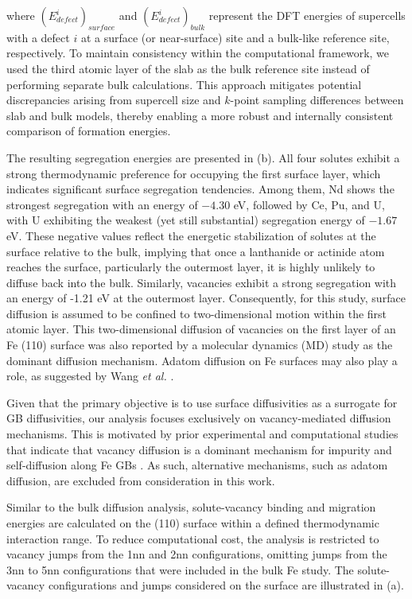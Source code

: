 \documentclass[preprint,12pt]{elsarticle}
\begin{document}
\noindent where \( (E_{defect}^{i})_{surface} \) and \( (E_{defect}^{i})_{bulk} \) represent the DFT energies of supercells with a defect $i$ at a surface (or near-surface) site and a bulk-like reference site, respectively. To maintain consistency within the computational framework, we used the third atomic layer of the slab as the bulk reference site instead of performing separate bulk calculations. This approach mitigates potential discrepancies arising from supercell size and \( k \)-point sampling differences between slab and bulk models, thereby enabling a more robust and internally consistent comparison of formation energies.

The resulting segregation energies are presented in (b). All four solutes exhibit a strong thermodynamic preference for occupying the first surface layer, which indicates significant surface segregation tendencies. Among them, Nd shows the strongest segregation with an energy of \( -4.30 \) eV, followed by Ce, Pu, and U, with U exhibiting the weakest (yet still substantial) segregation energy of \( -1.67 \) eV. These negative values reflect the energetic stabilization of solutes at the surface relative to the bulk, implying that once a lanthanide or actinide atom reaches the surface, particularly the outermost layer, it is highly unlikely to diffuse back into the bulk. Similarly, vacancies exhibit a strong segregation with an energy of -1.21 eV at the outermost layer. Consequently, for this study, surface diffusion is assumed to be confined to two-dimensional motion within the first atomic layer. This two-dimensional diffusion of vacancies on the first layer of an Fe (110) surface was also reported by a molecular dynamics (MD) study \cite{wang2010single} as the dominant diffusion mechanism. Adatom diffusion on Fe surfaces may also play a role, as suggested by Wang \textit{et al.} \cite{wang2012molecular}.

Given that the primary objective is to use surface diffusivities as a surrogate for GB diffusivities, our analysis focuses exclusively on vacancy-mediated diffusion mechanisms. This is motivated by prior experimental and computational studies that indicate that vacancy diffusion is a dominant mechanism for impurity and self-diffusion along Fe GBs \cite{balluffi1982grain,peterson1983grain, klotsman1990impurity, kwok1981, inoue2007grain}. As such, alternative mechanisms, such as adatom diffusion, are excluded from consideration in this work.

Similar to the bulk diffusion analysis, solute-vacancy binding and migration energies are calculated on the (110) surface within a defined thermodynamic interaction range. To reduce computational cost, the analysis is restricted to vacancy jumps from the 1nn and 2nn configurations, omitting jumps from the 3nn to 5nn configurations that were included in the bulk Fe study. The solute-vacancy configurations and jumps considered on the surface are illustrated in (a).
\end{document}

